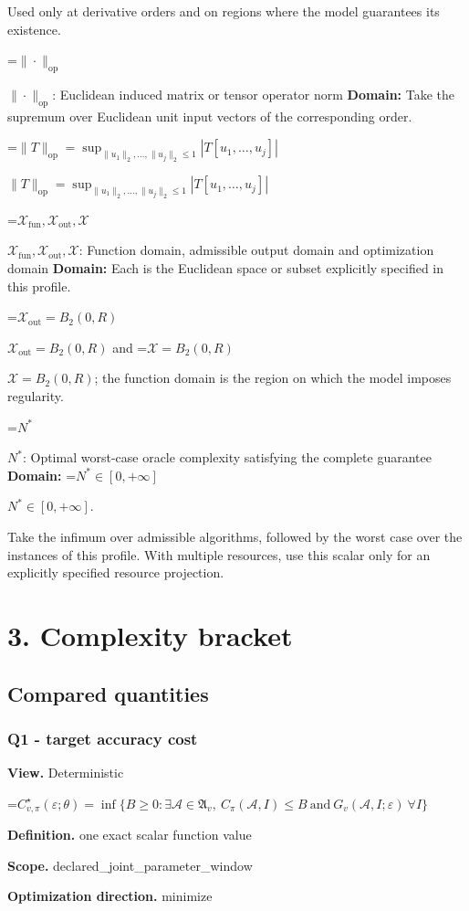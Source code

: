 \documentclass[10pt,a4paper]{article}
\newcommand{\AtlasMath}[1]{\par\begingroup\centering\setbox0=\hbox{$\displaystyle #1$}\ifdim\wd0>1.4\linewidth\typeout{ATLAS WIDE FORMULA: \the\wd0}\fi\ifdim\wd0>\linewidth\resizebox{\linewidth}{!}{\box0}\else\box0\fi\par\endgroup}
\newcommand{\AtlasInlineMath}[1]{\begingroup\setbox0=\hbox{$#1$}\ifdim\wd0>.4\linewidth\endgroup\AtlasMath{#1}\else\endgroup$#1$\fi}
\begin{document}
Used only at derivative orders and on regions where the model guarantees its existence.

\AtlasInlineMath{\|\cdot\|_{\mathrm{op}}}: Euclidean induced matrix or tensor operator norm \textbf{Domain:} Take the supremum over Euclidean unit input vectors of the corresponding order.

\AtlasInlineMath{\|T\|_{\mathrm{op}}=\sup_{\|u_1\|_2,\ldots,\|u_j\|_2\le1}|T[u_1,\ldots,u_j]|}

\AtlasInlineMath{\mathcal{X}_{\mathrm{fun}},\mathcal{X}_{\mathrm{out}},\mathcal{X}}: Function domain, admissible output domain and optimization domain \textbf{Domain:} Each is the Euclidean space or subset explicitly specified in this profile.

\AtlasInlineMath{\mathcal{X}_{\mathrm{out}}=B_2(0,R)} and \AtlasInlineMath{\mathcal{X}=B_2(0,R)}; the function domain is the region on which the model imposes regularity.

\AtlasInlineMath{N^*}: Optimal worst-case oracle complexity satisfying the complete guarantee \textbf{Domain:} \AtlasInlineMath{N^*\in[0,+\infty]}.

Take the infimum over admissible algorithms, followed by the worst case over the instances of this profile. With multiple resources, use this scalar only for an explicitly specified resource projection.

\section{3. Complexity bracket}
\subsection{Compared quantities}
\subsubsection{Q1 - target accuracy cost}
\textbf{View.} Deterministic

\AtlasMath{C^\star_{v,\pi}(\varepsilon;\theta)=\inf\{B\ge0:\exists\mathcal A\in\mathfrak A_v,\ C_\pi(\mathcal A,I)\le B\ \text{and}\ G_v(\mathcal A,I;\varepsilon)\ \forall I\}}
\textbf{Definition.} one exact scalar function value

\textbf{Scope.} declared\_\allowbreak{}joint\_\allowbreak{}parameter\_\allowbreak{}window

\textbf{Optimization direction.} minimize
\end{document}

